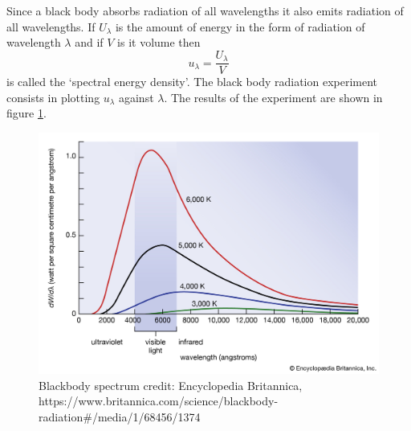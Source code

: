 Since a black body absorbs radiation of all wavelengths it also emits radiation
of all wavelengths. If $U_\lambda$ is the amount of energy in the form of 
radiation of wavelength $\lambda$ and if $V$ is it volume then 
\begin{equation}\label{c2s1e1}
u_\lambda = \frac{U_\lambda}{V}
\end{equation}
is called the `spectral energy density'. The black body radiation experiment
consists in plotting $u_\lambda$ against $\lambda$. The results of the 
experiment are shown in figure \ref{c2f1}. 
\begin{figure}
\includegraphics[scale=0.25]{bb}
\caption{Blackbody spectrum credit: Encyclopedia Britannica,\\
https://www.britannica.com/science/blackbody-radiation\#/media/1/68456/1374}
\label{c2f1}
\end{figure}

